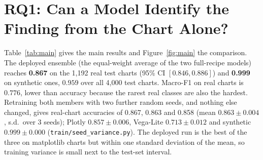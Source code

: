 \section{RQ1: Can a Model Identify the Finding from the Chart Alone?}
\label{sec:rq1}

Table~\ref{tab:main} gives the main results and Figure~\ref{fig:main} the comparison.
The deployed ensemble (the equal-weight average of the two full-recipe models) reaches
\textbf{0.867} on the 1{,}192 real test charts (95\% CI $[0.846, 0.886]$) and
\textbf{0.999} on synthetic ones, $0.959$ over all 4{,}000 test charts. Macro-F1 on
real charts is $0.776$, lower than accuracy because the rarest real classes are also
the hardest. Retraining both members with two further random seeds, and nothing else changed, gives real-chart accuracies of 0.867, 0.863 and 0.858 (mean $0.863 \pm 0.004$, s.d.\ over 3 seeds); Plotly $0.857 \pm 0.006$, Vega-Lite $0.713 \pm 0.012$ and synthetic $0.999 \pm 0.000$ (\texttt{train/seed\_variance.py}). The deployed run is the best of the three on matplotlib charts but within one standard deviation of the mean, so training variance is small next to the test-set interval.

